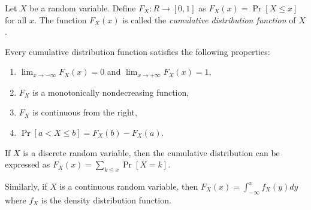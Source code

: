 \documentclass{article}
\DeclareMathOperator{\Prb}{Pr}
\begin{document}
Let $X$ be a random variable. Define $F_X\colon R \to [0,1] $ as
$F_X(x) = \Prb[X \leq x]$
for all $x$. The function $F_X(x)$ is called the \emph{cumulative distribution function} of $X$.

Every cumulative distribution function satisfies the following properties:
\begin{enumerate}
\item $\lim_{x \to -\infty}{F_X(x)}=0$  and  $\lim_{x \to +\infty}{F_X(x)}=1$,
\item $F_X$ is a monotonically nondecreasing function,
\item $F_X$ is continuous from the right,
\item $\Prb[a < X \leq b] = F_X(b) - F_X(a)$.
\end{enumerate}

If $X$ is a discrete random variable, then the cumulative distribution can be expressed as
$F_X(x) = \sum_{k\leq x} \Prb[X = k]$.

Similarly, if $X$ is a continuous random variable, then
$F_X(x) = \int_{-\infty}^{x} f_X(y) dy$ where $f_X$ is the density distribution function.


%
%
%
\end{document}
